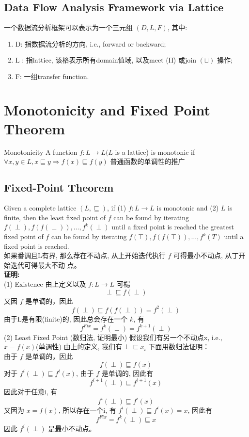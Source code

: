 \documentclass[a4paper]{article}
\theoremstyle{definition}
\begin{document}
\subsection{Data Flow Analysis Framework via Lattice}
一个数据流分析框架可以表示为一个三元组 $(D, L, F)$, 其中:
\begin{enumerate}
\item D: 指数据流分析的方向, i.e., forward or backward;
\item $\mathrm{L}$ : 指lattice, 该格表示所有domain值域, 以及meet (П) 或join $(\sqcup)$ 操作;
\item F: 一组transfer function.
\end{enumerate}

\section{Monotonicity and Fixed Point Theorem}
Monotonicity 
A function $f: L \rightarrow L(L$ is a lattice) is monotonic if $\forall x, y \in L, x \sqsubseteq y \Longrightarrow f(x) \sqsubseteq f(y)$
普通函数的单调性的推广
\subsection{Fixed-Point Theorem}
Given a complete lattice $(L, \sqsubseteq)$, if (1) $f: L \rightarrow L$ is monotonic and (2) $L$ is finite, then the least fixed point of $f$ can be found by iterating $f(\perp), f(f(\perp)), \ldots, f^{k}(\perp)$ until a fixed
point is reached the greatest fixed point of $f$ can be found by iterating
$f(\top), f(f(\top)), \ldots, f^{k}(T)$ until a fixed point is reached.\\
如果番调且L有界, 那么荐在不动点, 从上开始迭代执行 $f$ 可得最小不动点, 从丁开始迭代可得最大不动
点。\\
\textbf{证明:}\\
(1) Existence
由上定义以及 $f: L \rightarrow L$ 可楊
$$
\perp \sqsubseteq f(\perp)
$$
又因 $f$ 是单调的，因此
$$
f(\perp) \sqsubseteq f(f(\perp))=f^{2}(\perp)
$$
由于L是有限(finite)的, 因此总会存在一个 $k$, 有
$$
f^{F i x}=f^{k}(\perp)=f^{k+1}(\perp)
$$
(2) Least Fixed Point (数归法, 证明最小)
假设我们有另一个不动点x, i.e., $x=f(x)$(单调性)
由上的定义, 我们有$\perp\sqsubseteq x_{i}$
下面用数归法证明：\\
由于 $f$ 是单调的，因此
$$
f(\perp) \sqsubseteq f(x)
$$
对于 $f^{i}(\perp) \sqsubseteq f^{i}(x)$, 由于 $f$ 是单调的, 因此有
$$
f^{i+1}(\perp) \sqsubseteq f^{i+1}(x)
$$
因此对于任意i, 有
$$
f^{i}(\perp) \sqsubseteq f^{i}(x)
$$
又因为 $x=f(x)$, 所以存在一个i, 有 $f^{i}(\perp) \sqsubseteq f^{i}(x)=x$, 因此有
$$
f^{F i x}=f^{k}(\perp) \sqsubseteq x
$$
因此 $f^{i}(\perp)$ 是最小不动点。
\end{document}
